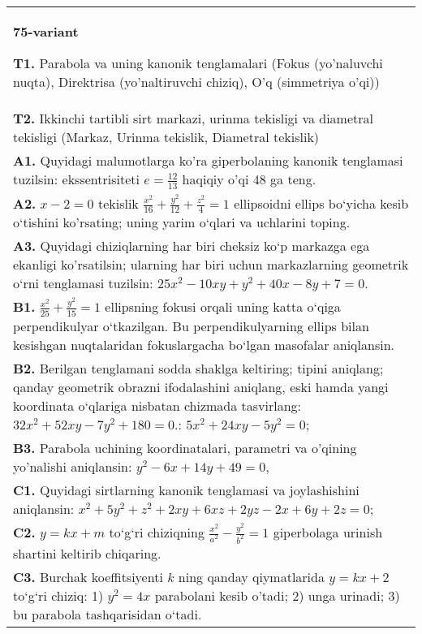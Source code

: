 \documentclass{article}
\begin{document}
\begin{tabular}{m{17cm}}
\textbf{75-variant}
\newline

\textbf{T1.} Parabola va uning kanonik tenglamalari (Fokus (yo’naluvchi nuqta), Direktrisa (yo’naltiruvchi chiziq), O’q (simmetriya o’qi)) \\
\textbf{T2.} Ikkinchi tartibli sirt markazi, urinma tekisligi va diametral tekisligi (Markaz, Urinma tekislik, Diametral tekislik) \\
\textbf{A1.} Quyidagi malumotlarga ko'ra giperbolaning kanonik tenglamasi tuzilsin: ekssentrisiteti $e=\frac{12}{13}$ haqiqiy o'qi 48 ga teng. \\
\textbf{A2.} $x-2=0$ tekislik $\frac{x^2}{16}+\frac{y^2}{12}+\frac{z^2}{4}=1$ ellipsoidni ellips bo‘yicha kesib o‘tishini ko'rsating; uning yarim o‘qlari va uchlarini toping. \\
\textbf{A3.} Quyidagi chiziqlarning har biri cheksiz ko‘p markazga ega ekanligi ko'rsatilsin; ularning har biri uchun markazlarning geometrik o‘rni tenglamasi tuzilsin: $25 x^2-10 x y+y^2+40 x-8 y+7=0$. \\
\textbf{B1.} $\frac{x^2}{25}+\frac{y^2}{15}=1$ ellipsning fokusi orqali uning katta o‘qiga perpendikulyar o‘tkazilgan. Bu perpendikulyarning ellips bilan kesishgan nuqtalaridan fokuslargacha bo‘lgan masofalar aniqlansin. \\
\textbf{B2.} Berilgan tenglamani sodda shaklga keltiring; tipini aniqlang; qanday geometrik obrazni ifodalashini aniqlang, eski hamda yangi koordinata o‘qlariga nisbatan chizmada tasvirlang: $32x^2+52xy-7y^2+180=0$.: $5 x^2+24 x y-5 y^2=0$; \\
\textbf{B3.} Parabola uchining koordinatalari, parametri va o'qining yo'nalishi aniqlansin: $y^2-6 x+14 y+49=0$, \\
\textbf{C1.} Quyidagi sirtlarning kanonik tenglamasi va joylashishini aniqlansin: $x^2+5 y^2+z^2+2 x y+6 x z+2 y z-2 x+6 y+2 z=0$; \\
\textbf{C2.} $y=k x+m$ to‘g‘ri chiziqning $\frac{x^2}{a^2}-\frac{y^2}{b^2}=1$ giperbolaga urinish shartini keltirib chiqaring. \\
\textbf{C3.} Burchak koeffitsiyenti $k$ ning qanday qiymatlarida $y=kx+2$ to‘g‘ri chiziq: 1) $y^2=4x$ parabolani kesib o'tadi; 2) unga urinadi; 3) bu parabola tashqarisidan o‘tadi. \\

\end{tabular}
\vspace{1cm}
\end{document}
